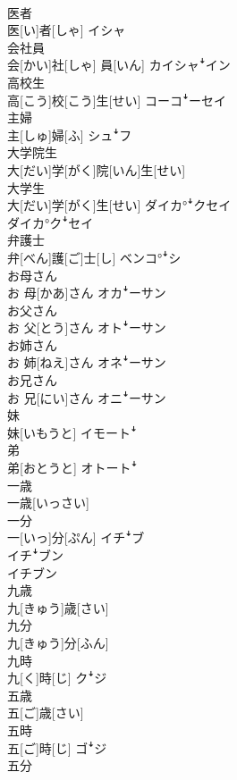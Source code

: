 \documentclass[8pt]{extreport}
\begin{document}
\begin{CJK}{UTF8}{min}
\\	医者	
\\	医[い]者[しゃ]	イシャ
\\	会社員	
\\	会[かい]社[しゃ] 員[いん]	カイシャꜜイン
\\	高校生	
\\	高[こう]校[こう]生[せい]	コーコꜜーセイ
\\	主婦	
\\	主[しゅ]婦[ふ]	シュꜜフ
\\	大学院生	
\\	大[だい]学[がく]院[いん]生[せい]	
\\	大学生	
\\	大[だい]学[がく]生[せい]	ダイカ°ꜜクセイ 
\\	ダイカ°クꜜセイ
\\	弁護士	
\\	弁[べん]護[ご]士[し]	ベンコ°ꜜシ
\\	お母さん	
\\	お 母[かあ]さん	オカꜜーサン
\\	お父さん	
\\	お 父[とう]さん	オトꜜーサン
\\	お姉さん	
\\	お 姉[ねえ]さん	オネꜜーサン
\\	お兄さん	
\\	お 兄[にい]さん	オニꜜーサン
\\	妹	
\\	妹[いもうと]	イモートꜜ
\\	弟	
\\	弟[おとうと]	オトートꜜ
\\	一歳	
\\	一歳[いっさい]	
\\	一分	
\\	一[いっ]分[ぷん]	イチꜜブ 
\\	イチꜜブン 
\\	イチブン
\\	九歳	
\\	九[きゅう]歳[さい]	
\\	九分	
\\	九[きゅう]分[ふん]	
\\	九時	
\\	九[く]時[じ]	クꜜジ
\\	五歳	
\\	五[ご]歳[さい]	
\\	五時	
\\	五[ご]時[じ]	ゴꜜジ
\\	五分	

\end{CJK}
\end{document}
